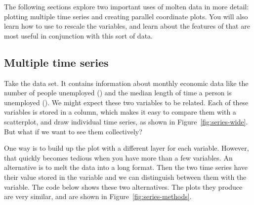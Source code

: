 The following sections explore two important uses of molten data in more detail: plotting multiple time series and creating parallel coordinate plots. You will also learn how to use  to rescale the variables, and learn about the features of \ggplot that are most useful in conjunction with this sort of data.

\subsection{Multiple time series}
\label{sub:time-series}

Take the  data set.  It contains information about monthly economic data like the number of people unemployed () and the median length of time a person is unemployed ().  We might expect these two variables to be related.  Each of these variables is stored in a column, which makes it easy to compare them with a scatterplot, and draw individual time series, as shown in Figure~\ref{fig:series-wide}.  But what if we want to see them collectively?

% 


One way is to build up the plot with a different layer for each variable.   However, that quickly becomes tedious when you have more than a few variables.  An alternative is to melt the data into a long format. Then the two time series have their value stored in the  variable and we can distinguish between them with the  variable.  The code below shows these two alternatives.  The plots they produce are very similar, and are shown in Figure~\ref{fig:series-methods}.

% 
%


